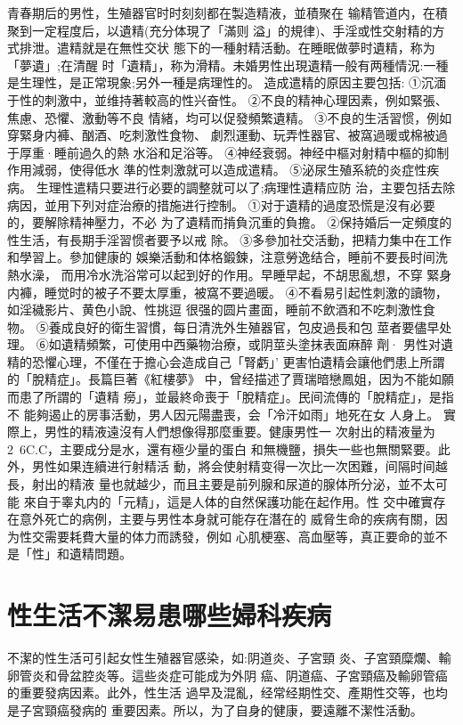 \documentclass[12pt,UTF8]{ctexbook}
\begin{document}
青春期后的男性，生殖器官时时刻刻都在製造精液，並積聚在
输精管道内，在積聚到一定程度后，以遺精(充分体現了「滿则
溢」的規律)、手淫或性交射精的方式排泄。遣精就是在無性交状
態下的一種射精活動。在睡眠做夢时遺精，称为「夢遺」;在清醒
时「遺精」，称为滑精。未婚男性出現遺精一般有两種情況:一種
是生理性，是正常現象;另外一種是病理性的。
造成遣精的原因主要包括:
①沉湎于性的刺激中，並维持著較高的性兴奋性。
②不良的精神心理因素，例如緊張、焦慮、恐懼、激動等不良
情緒，均可以促發頻繁遺精。
③不良的生活習惯，例如穿緊身内褲、酗酒、吃刺激性食物、
劇烈運動、玩弄性器官、被窩過暖或棉被過于厚重·睡前過久的熱
水浴和足浴等。
④神经衰弱。神经中樞对射精中樞的抑制作用減弱，使得低水
準的性刺激就可以造成遣精。
⑤泌尿生殖系統的炎症性疾病。
生理性遣精只要进行必要的調整就可以了;病理性遺精应防
治，主要包括去除病因，並用下列对症治療的措施进行控制。
①对于遺精的過度恐慌是沒有必要的，要解除精神壓力，不必
为了遺精而掯負沉重的負擔。
②保持婚后一定頻度的性生活，有長期手淫習惯者要予以戒
除。
③多參加社交活動，把精力集中在工作和學習上。參加健康的
娛樂活動和体格鍛鍊，注意勞逸结合，睡前不要長时间洗熱水澡，
而用冷水洗浴常可以起到好的作用。早睡早起，不胡思亂想，不穿
緊身内褲，睡觉时的被子不要太厚重，被窩不要過暖。
④不看易引起性刺激的讀物，如淫穢影片、黄色小說、性挑逗
很强的圆片畫面，睡前不飲酒和不吃刺激性食物。
⑤養成良好的衛生習慣，每日清洗外生殖器官，包皮過長和包
莖者要儘早处理。
⑥如遺精頻繁，可使用中西藥物治療，或阴莖头塗抹表面麻醉
劑·
男性对遺精的恐懼心理，不僅在于擔心会造成自己「腎虧」’
更害怕遺精会讓他們患上所謂的「脫精症」。長篇巨著《紅樓夢》
中，曾经描述了賈瑞暗戀鳳姐，因为不能如願而患了所謂的「遺精
癆」，並最終命喪于「脫精症」。民间流傳的「脫精症」，是指不
能夠遏止的房事活動，男人因元陽盡喪，会「冷汗如雨」地死在女
人身上。
實際上，男性的精液遠沒有人們想像得那麼重要。健康男性一
次射出的精液量为2~6C.C，主要成分是水，還有極少量的蛋白
和無機鹽，損失一些也無關緊要。此外，男性如果连續进行射精活
動，將会使射精变得一次比一次困難，间隔时间越長，射出的精液
量也就越少，而且主要是前列腺和尿道的腺体所分泌，並不太可能
來自于睾丸内的「元精」，這是人体的自然保護功能在起作用。性
交中確實存在意外死亡的病例，主要与男性本身就可能存在潛在的
威脅生命的疾病有關，因为性交需要耗費大量的体力而誘發，例如
心肌梗塞、高血壓等，真正要命的並不是「性」和遺精問題。

\section{性生活不潔易患哪些婦科疾病}

不潔的性生活可引起女性生殖器官感染，如:阴道炎、子宮頸
炎、子宮頸糜爛、輸卵管炎和骨盆腔炎等。這些炎症可能成为外阴
癌、阴道癌、子宮頸癌及輸卵管癌的重要發病因素。此外，性生活
過早及混亂，经常经期性交、產期性交等，也均是子宮頸癌發病的
重要因素。所以，为了自身的健康，要遠離不潔性活動。
\end{document}
